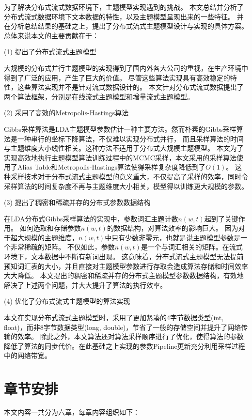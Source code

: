 为了解决分布式流式数据环境下，主题模型实现遇到的挑战。
本文总结并分析了分布式流式数据环境下文本数据的特性，以及主题模型呈现出来的一些特征。
并在分析总结结果的基础之上，提出了分布式流式主题模型设计与实现的具体方案。
总体来说本文的主要贡献在于：

(1) 提出了分布式流式主题模型

大规模的分布式并行主题模型的实现得到了国内外各大公司的重视，在生产环境中得到了广泛的应用，产生了巨大的价值。
尽管这些算法实现具有高效稳定的特性，这些算法实现并不是针对流式数据设计的。
本文针对分布式流式数据提出了两个算法框架，分别是在线流式主题模型和增量流式主题模型。%

(2) 采用了高效的Metropolis-Hastings算法

Gibbs采样算法是LDA主题模型参数估计一种主要方法。然而朴素的Gibbs采样算法是一种串行的坐标下降算法，不仅难以实现分布式并行，
而且采样算法的时间与主题维度大小线性相关。这种方法不适用于分布式大规模主题模型。
本文为了实现高效地执行主题模型算法训练过程中的MCMC采样，本文采用的采样算法使用了Alias Table和Metropolis-Hastings算法使得采样复杂度降低到了$O(1)$。
这种采样技术对于分布式流式主题模型的意义重大，不仅提高了采样的效率，同时令采样算法的时间复杂度不再与主题维度大小相关，模型得以训练更大规模的参数。

(3) 提出了稠密和稀疏并存的分布式参数数据结构

在LDA分布式Gibbs采样算法的实现中，参数词汇主题计数$n(w, t)$起到了关键作用。
如何选取和存储参数$n(w, t)$的数据结构，对算法效率的影响巨大。
因为对于超大规模的主题维度，$n(w,t)$中只有少数非零元，也就是说主题模型参数是一个非常稀疏的矩阵。
不仅如此，参数$n(w, t)$是一个与词汇相关的矩阵。在流式环境下，文本数据中不断有新词出现。
这意味着，分布式流式主题模型无法提前预知词汇表的大小，并且直接对主题模型参数进行存取会造成算法存储和时间效率大大降低。
本文提出的稠密和稀疏并存的分布式主题模型参数数据结构，有效地解决了上述两个问题，并大大提升了算法的执行效率。

(4) 优化了分布式流式主题模型的算法实现

本文在实现分布式流式主题模型时，采用了更加紧凑的4字节数据类型(int, float)，而非8字节数据类型(long, double)，节省了一般的存储空间并提升了网络传输的效率。
除此之外，本文算法还对算法采样顺序进行了优化，使得算法的参数降低了算法的同步代价。在此基础之上实现的参数Pipeline更新充分利用采样过程中的网络带宽。

\section{章节安排}
本文内容一共分为六章，每章内容组织如下：


